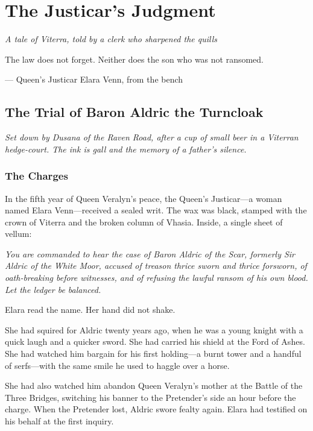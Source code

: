 \documentclass[11pt]{book}
\begin{document}
\chapter*{The Justicar's Judgment}

\vspace{2cm}
\begin{center}
\textit{A tale of Viterra, told by a clerk who sharpened the quills}
\end{center}
\vspace{1cm}

\epigraph{The law does not forget. Neither does the son who was not ransomed.}{--- Queen's Justicar Elara Venn, from the bench}

\section*{The Trial of Baron Aldric the Turncloak}

\textit{Set down by Dusana of the Raven Road, after a cup of small beer in a Viterran hedge-court. The ink is gall and the memory of a father's silence.}

\subsection*{The Charges}

In the fifth year of Queen Veralyn's peace, the Queen's Justicar---a woman named Elara Venn---received a sealed writ. The wax was black, stamped with the crown of Viterra and the broken column of Vhasia. Inside, a single sheet of vellum:

\emph{You are commanded to hear the case of Baron Aldric of the Scar, formerly Sir Aldric of the White Moor, accused of treason thrice sworn and thrice forsworn, of oath-breaking before witnesses, and of refusing the lawful ransom of his own blood. Let the ledger be balanced.}

Elara read the name. Her hand did not shake.

She had squired for Aldric twenty years ago, when he was a young knight with a quick laugh and a quicker sword. She had carried his shield at the Ford of Ashes. She had watched him bargain for his first holding---a burnt tower and a handful of serfs---with the same smile he used to haggle over a horse.

She had also watched him abandon Queen Veralyn's mother at the Battle of the Three Bridges, switching his banner to the Pretender's side an hour before the charge. When the Pretender lost, Aldric swore fealty again. Elara had testified on his behalf at the first inquiry.
\end{document}
